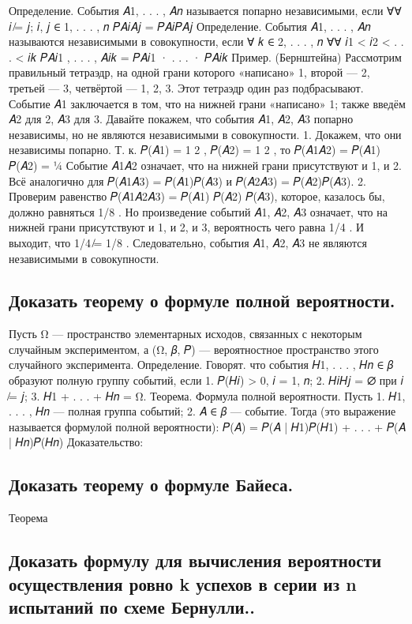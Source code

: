 Определение. События 𝐴1, . . . , 𝐴𝑛 называется попарно независимыми, если
∀∀ 𝑖 ̸= 𝑗; 𝑖, 𝑗 ∈ {1, . . . , 𝑛} 𝑃{𝐴𝑖𝐴𝑗} = 𝑃{𝐴𝑖}𝑃{𝐴𝑗}
Определение. События 𝐴1, . . . , 𝐴𝑛 называются независимыми в совокупности, если
∀ 𝑘 ∈ {2, . . . , 𝑛} ∀∀ 𝑖1 < 𝑖2 < . . . < 𝑖𝑘 𝑃{𝐴𝑖1 , . . . , 𝐴𝑖𝑘 } = 𝑃{𝐴𝑖1 } · . . . · 𝑃{𝐴𝑖𝑘 }
Пример. (Бернштейна) 
Рассмотрим правильный тетраэдр, на одной грани которого «написано» 1, второй — 2, третьей — 3, четвёртой — 1, 2, 3.
Этот тетраэдр один раз подбрасывают. 
Событие 𝐴1 заключается в том, что на нижней грани «написано» 1; также введём 𝐴2 для 2, 𝐴3 для 3. Давайте покажем, что события 𝐴1, 𝐴2, 𝐴3 попарно независимы, но не являются независимыми в совокупности. 
1. Докажем, что они независимы попарно. Т. к. 𝑃(𝐴1) = 1 2 , 𝑃(𝐴2) = 1 2 , то
𝑃(𝐴1𝐴2) = 𝑃(𝐴1) 𝑃(𝐴2) = ¼
Событие 𝐴1𝐴2 означает, что на нижней грани присутствуют и 1, и 2. Всё аналогично для 𝑃(𝐴1𝐴3) = 𝑃(𝐴1)𝑃(𝐴3) и 𝑃(𝐴2𝐴3) = 𝑃(𝐴2)𝑃(𝐴3).
2. Проверим равенство 𝑃(𝐴1𝐴2𝐴3) = 𝑃(𝐴1) 𝑃(𝐴2) 𝑃(𝐴3), которое, казалось бы, должно равняться 1/8 . Но произведение событий 𝐴1, 𝐴2, 𝐴3 означает, что на нижней грани присутствуют и 1, и 2, и 3, вероятность чего равна 1/4 . И выходит, что 1/4 ̸= 1/8 .
Следовательно, события 𝐴1, 𝐴2, 𝐴3 не являются независимыми в совокупности.

\subsection{Доказать теорему о формуле полной вероятности.}

Пусть Ω — пространство элементарных исходов, связанных с некоторым случайным экспериментом, а (Ω, 𝛽, 𝑃) — вероятностное пространство этого случайного эксперимента.
Определение. Говорят. что события 𝐻1, . . . , 𝐻𝑛 ∈ 𝛽 образуют полную группу событий, если 
1. 𝑃(𝐻𝑖) > 0, 𝑖 = 1, 𝑛;
2. 𝐻𝑖𝐻𝑗 = ∅ при 𝑖 ̸= 𝑗; 
3. 𝐻1 + . . . + 𝐻𝑛 = Ω.
Теорема. Формула полной вероятности. Пусть 
1. 𝐻1, . . . , 𝐻𝑛 — полная группа событий; 
2. 𝐴 ∈ 𝛽 — событие. 
Тогда (это выражение называется формулой полной вероятности):
𝑃(𝐴) = 𝑃(𝐴 | 𝐻1)𝑃(𝐻1) + . . . + 𝑃(𝐴 | 𝐻𝑛)𝑃(𝐻𝑛)
Доказательство:

\subsection{Доказать теорему о формуле Байеса.}

Теорема

\subsection{Доказать формулу для вычисления вероятности осуществления ровно k успехов в серии из n испытаний по схеме Бернулли..}
